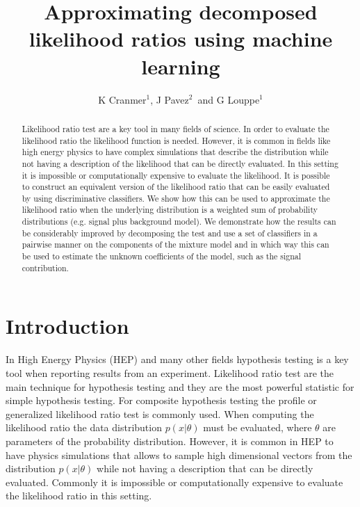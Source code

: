 \documentclass[a4paper]{jpconf}
\begin{document}
\title{Approximating decomposed likelihood ratios using machine learning}

\author{K Cranmer$^1$, J Pavez$^2$\ and
G Louppe$^1$}%

\address{$^1$ Physics Department, New York University, New York, NY 10003, U.S.A.}
\address{$^2$ Informatics Department, Universidad T\'ecnica Federico Santa Mar\'ia, 1240 Av. Espa\~na, Valpara\'iso, Chile}



\begin{abstract}
Likelihood ratio test are a key tool in many fields of science. In order to evaluate the likelihood ratio the likelihood function is needed. However, it is common in fields like high energy physics to have complex simulations that describe the distribution while not having a description of the likelihood that can be directly evaluated. In this setting it is impossible or computationally expensive to evaluate the likelihood. It is possible to construct an equivalent version of the likelihood ratio that can be easily evaluated by using discriminative classifiers. We show how this can be used to approximate the likelihood ratio when the underlying distribution is a weighted sum of probability distributions (e.g. signal plus background model). We demonstrate how the results can be considerably improved by decomposing the test and use a set of classifiers in a pairwise manner on the components of the mixture model and in which way this can be used to estimate the unknown coefficients of the model, such as the signal contribution.
\end{abstract}
\section{Introduction}

In High Energy Physics (HEP) and many other fields hypothesis testing is a key tool when reporting results from an experiment. Likelihood ratio test are 
the main technique for hypothesis testing and they are the most powerful statistic for simple hypothesis testing. For composite hypothesis 
testing the profile or generalized likelihood ratio test is commonly used. When computing the likelihood ratio the data distribution $p(x|\theta)$ must 
be evaluated, where $\theta$ are parameters of the probability distribution. However, it is common in HEP to have physics simulations that allows to sample high dimensional vectors from the distribution $p(x|\theta)$ while not having a description that can be directly evaluated. Commonly it is impossible or computationally expensive to evaluate the likelihood ratio in this setting. %
\end{document}
